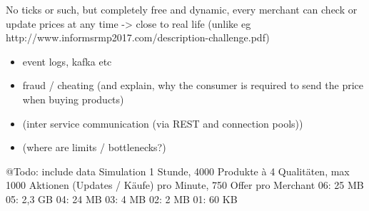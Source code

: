 No ticks or such, but completely free and dynamic, every merchant can check or update prices at any time -> close to real life (unlike eg http://www.informsrmp2017.com/description-challenge.pdf)

\begin{itemize}
\item event logs, kafka etc
\item fraud / cheating (and explain, why the consumer is required to send the price when buying products)
\item (inter service communication (via REST and connection pools))
\item (where are limits / bottlenecks?)
\end{itemize} 

@Todo: include data
Simulation 1 Stunde, 4000 Produkte à 4 Qualitäten, max 1000 Aktionen (Updates / Käufe) pro Minute, 750 Offer pro Merchant
06: 25 MB
05: 2,3 GB
04: 24 MB
03: 4 MB
02: 2 MB
01: 60 KB